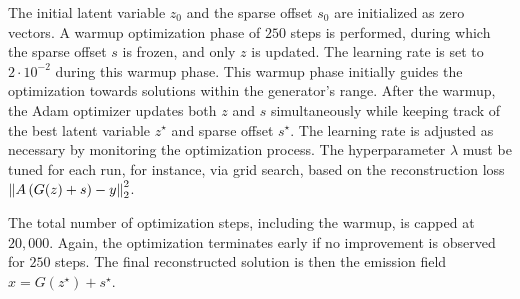 The initial latent variable $z_0$ and the sparse offset $s_0$ are initialized as zero vectors.
A warmup optimization phase of $250$ steps is performed, during which the sparse offset $s$ is frozen, and only $z$ is updated.
The learning rate is set to $2 \cdot 10^{-2}$ during this warmup phase.
This warmup phase initially guides the optimization towards solutions within the generator's range.
After the warmup, the Adam optimizer updates both $z$ and $s$ simultaneously while keeping track of the best latent variable $z^\star$ and sparse offset $s^\star$.
The learning rate is adjusted as necessary by monitoring the optimization process.
The hyperparameter $\lambda$ must be tuned for each run, for instance, via grid search, based on the reconstruction loss $\left\lVert A \left( G(z) + s \right) - y\right\rVert_2^2$.

The total number of optimization steps, including the warmup, is capped at $20,000$.
Again, the optimization terminates early if no improvement is observed for $250$ steps.
The final reconstructed solution is then the emission field $\hat{x} = G(z^\star) + s^\star$.
